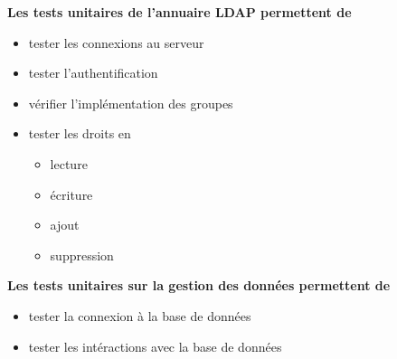 \begin{frame}
\begin{block}{\textbf{Les tests unitaires de l'annuaire LDAP permettent de}}
\begin{itemize}
\item tester les connexions au serveur
\item tester l'authentification
\item vérifier l'implémentation des groupes
\item tester les droits en\begin{itemize} \item lecture
					  \item écriture
					  \item ajout
					  \item suppression
			  \end{itemize}		
\end{itemize}
\end{block}
\end{frame}


\begin{frame}
\begin{block}{\textbf{Les tests unitaires sur la gestion des données permettent de}}
\begin{itemize}
\item tester la connexion à la base de données
\item tester les intéractions avec la base de données
\end{itemize}
\end{block}
\end{frame}

